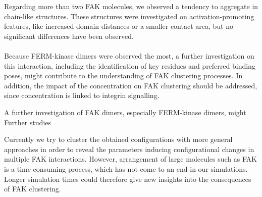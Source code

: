 Regarding more than two FAK molecules, we observed a tendency to aggregate in chain-like structures. These structures were investigated on activation-promoting features, like increased domain distances or a smaller contact area, but no significant differences have been observed.\\
\\
Because FERM-kinase dimers were observed the most, a further investigation on this interaction, including the identification of key residues and preferred binding poses, might contribute to the understanding of FAK clustering processes. In addition, the impact of the \pip{} concentration on FAK clustering should be addressed, since \pip{} concentration is linked to integrin signalling.





A further investigation of FAK dimers, especially FERM-kinase dimers, might 
Further studies

Currently we try to cluster the obtained configurations with more general approaches in order to reveal the parameters inducing configurational changes in multiple FAK interactions. However, arrangement of large molecules such as FAK is a time consuming process, which has not come to an end in our simulations. Longer simulation times could therefore give new insights into the consequences of FAK clustering. 